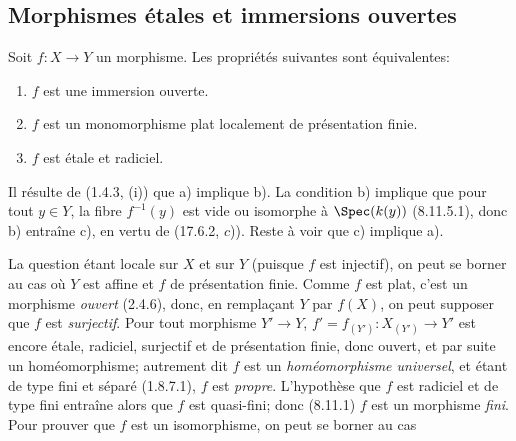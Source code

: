 \subsection{Morphismes étales et immersions ouvertes}
\label{IV.17.9}

\begin{theorem}[17.9.1]
\label{IV.17.9.1}
Soit $f:X\to Y$ un morphisme. Les propriétés suivantes sont équivalentes:
\begin{enumerate}
  \item[a)] $f$ est une immersion ouverte.
  \item[b)] $f$ est un monomorphisme plat localement de présentation finie.
  \item[c)] $f$ est étale et radiciel.
\end{enumerate}
\end{theorem}

Il résulte de (1.4.3, (i)) que a) implique b). La condition b) implique que pour tout $y\in Y$, la fibre $f^{-1}(y)$ est vide ou isomorphe à $\Spec(k(y))$ (8.11.5.1), donc b) entraîne c), en vertu de (17.6.2, $c$)). Reste à voir que c) implique a).

La question étant locale sur $X$ et sur $Y$ (puisque $f$ est injectif), on peut se borner au cas où $Y$ est affine et $f$ de présentation finie. Comme $f$ est plat, c'est un morphisme \emph{ouvert} (2.4.6), donc, en remplaçant $Y$ par $f(X)$, on peut supposer que $f$ est \emph{surjectif}. Pour tout morphisme $Y'\to Y$, $f'=f_{(Y')}:X_{(Y')}\to Y'$ est encore étale, radiciel, surjectif et de présentation finie, donc ouvert, et par suite un homéomorphisme; autrement dit $f$ est un \emph{homéomorphisme universel}, et étant de type fini et séparé (1.8.7.1), $f$ est \emph{propre}. L'hypothèse que $f$ est radiciel et de type fini entraîne alors que $f$ est quasi-fini; donc (8.11.1) $f$ est un morphisme \emph{fini}. Pour prouver que $f$ est un isomorphisme, on peut se borner au cas

